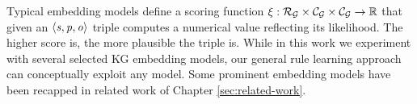 Typical embedding models define a scoring function $\xi: \mathcal{R}_{\mathcal{G}} \times \mathcal{C}_{\mathcal{G}} \times \mathcal{C}_{\mathcal{G}} \rightarrow \mathbb{R}$ that given an $\langle\mathit{s,p,o}\rangle$ triple computes a numerical value reflecting its likelihood. The higher score is, the more plausible the triple is. While in this work we experiment with several selected KG embedding models, our general rule learning approach can conceptually exploit any model. Some prominent embedding models have been recapped in related work of Chapter \ref{sec:related-work}.




